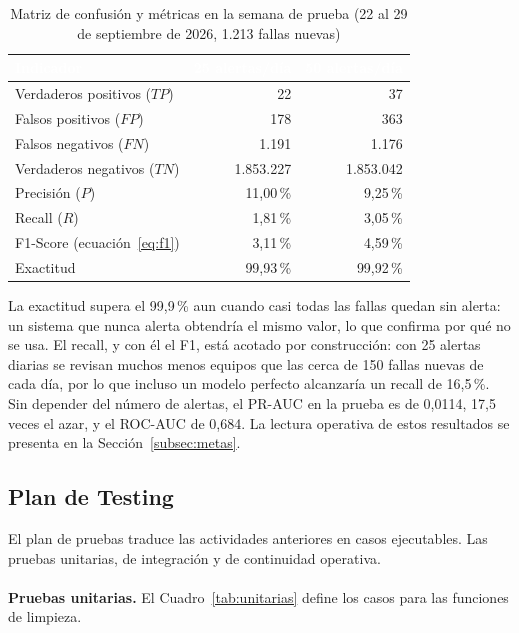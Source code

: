 \documentclass[12pt,a4paper]{article}
\begin{document}
\begin{table}[H]
\centering
\caption{Matriz de confusión y métricas en la semana de prueba (22 al 29 de septiembre de 2026, 1.213 fallas nuevas)}
\label{tab:confusion}
\small
\renewcommand{\arraystretch}{1.3}
\begin{tabular}{|p{5.2cm}|r|r|}
\hline
\rowcolor{black}
\textcolor{white}{\textbf{Indicador}} & \textcolor{white}{\textbf{25 alertas/día}} & \textcolor{white}{\textbf{50 alertas/día}} \\ \hline
Verdaderos positivos ($TP$) & 22 & 37 \\ \hline
Falsos positivos ($FP$) & 178 & 363 \\ \hline
Falsos negativos ($FN$) & 1.191 & 1.176 \\ \hline
Verdaderos negativos ($TN$) & 1.853.227 & 1.853.042 \\ \hline
Precisión ($P$) & 11,00\,\% & 9,25\,\% \\ \hline
Recall ($R$) & 1,81\,\% & 3,05\,\% \\ \hline
F1-Score (ecuación~\ref{eq:f1}) & 3,11\,\% & 4,59\,\% \\ \hline
Exactitud & 99,93\,\% & 99,92\,\% \\ \hline
\end{tabular}
\end{table}

\noindent
La exactitud supera el 99,9\,\% aun cuando casi todas las fallas quedan sin alerta: un sistema que nunca alerta obtendría el mismo valor, lo que confirma por qué no se usa. El recall, y con él el F1, está acotado por construcción: con 25 alertas diarias se revisan muchos menos equipos que las cerca de 150 fallas nuevas de cada día, por lo que incluso un modelo perfecto alcanzaría un recall de 16,5\,\%. Sin depender del número de alertas, el PR-AUC en la prueba es de 0,0114, 17,5 veces el azar, y el ROC-AUC de 0,684. La lectura operativa de estos resultados se presenta en la Sección~\ref{subsec:metas}.


\subsection{Plan de Testing}
\label{subsec:testing}
\noindent
El plan de pruebas traduce las actividades anteriores en casos ejecutables. Las pruebas unitarias, de integración y de continuidad operativa.
\\
\noindent
\\
\textbf{Pruebas unitarias.}
\newline
El Cuadro~\ref{tab:unitarias} define los casos  para  las funciones de limpieza.
\end{document}
